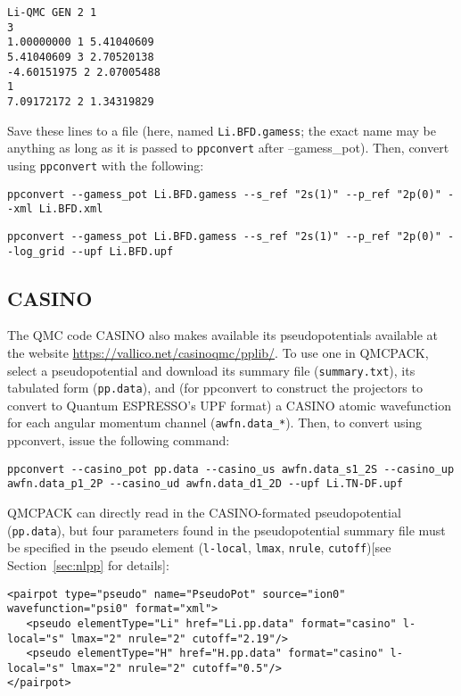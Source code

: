 \begin{lstlisting}[caption=BFD Li pseudopotential in GAMESS format]
Li-QMC GEN 2 1
3
1.00000000 1 5.41040609
5.41040609 3 2.70520138
-4.60151975 2 2.07005488
1
7.09172172 2 1.34319829
\end{lstlisting}
Save these lines to a file (here, named \texttt{Li.BFD.gamess}; the exact name may be anything as long as it is passed to \texttt{ppconvert} after --gamess\_pot).  Then, convert using \texttt{ppconvert} with the following:
\begin{lstlisting}[caption=Convert GAMESS-formatted pseudopotential to FSAtom xml format]
  ppconvert --gamess_pot Li.BFD.gamess --s_ref "2s(1)" --p_ref "2p(0)" --xml Li.BFD.xml
\end{lstlisting}
\begin{lstlisting}[caption=Convert GAMESS-formatted pseudopotential to Quantum ESPRESSO UPF format]
  ppconvert --gamess_pot Li.BFD.gamess --s_ref "2s(1)" --p_ref "2p(0)" --log_grid --upf Li.BFD.upf
\end{lstlisting}

\subsection{CASINO}
\label{subsec:CASINO}
The QMC code CASINO also makes available its pseudopotentials available at the website \url{https://vallico.net/casinoqmc/pplib/}. To use one in QMCPACK, select a pseudopotential and download its summary file (\texttt{summary.txt}), its tabulated form (\texttt{pp.data}), and (for ppconvert to construct the projectors to convert to Quantum ESPRESSO's UPF format) a CASINO atomic wavefunction for each angular momentum channel (\texttt{awfn.data\_*}).  Then, to convert using ppconvert, issue the following command:
\begin{lstlisting}[caption=Convert CASINO-formatted pseudopotential to Quantum ESPRESSO UPF format]
ppconvert --casino_pot pp.data --casino_us awfn.data_s1_2S --casino_up awfn.data_p1_2P --casino_ud awfn.data_d1_2D --upf Li.TN-DF.upf
\end{lstlisting}
QMCPACK can directly read in the CASINO-formated pseudopotential (\texttt{pp.data}), but four parameters found in the pseudopotential summary file must be specified in the pseudo element (\texttt{l-local}, \texttt{lmax}, \texttt{nrule}, \texttt{cutoff})[see Section~\ref{sec:nlpp} for details]:
\begin{lstlisting}[caption=XML syntax to use CASINO-formatted pseudopotentials in QMCPACK]
<pairpot type="pseudo" name="PseudoPot" source="ion0" wavefunction="psi0" format="xml">
   <pseudo elementType="Li" href="Li.pp.data" format="casino" l-local="s" lmax="2" nrule="2" cutoff="2.19"/>
   <pseudo elementType="H" href="H.pp.data" format="casino" l-local="s" lmax="2" nrule="2" cutoff="0.5"/>
</pairpot>
\end{lstlisting}

